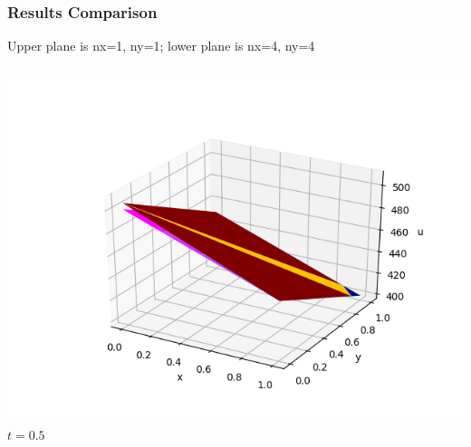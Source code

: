 \documentclass[]{beamer}
\begin{document}
\begin{frame}[t]\frametitle{Results Comparison}
  Upper plane is nx=1, ny=1; lower plane is nx=4, ny=4
  	\begin{columns}
			\begin{center}
			\includegraphics[scale=0.2]{figures/2D_xy_h1m/2D_xy_homog1mat_u_vs_x_05}\\
			\tiny$t=0.5$
			
			\null
			

\end{center}
\end{columns}
\end{frame}
\end{document}
